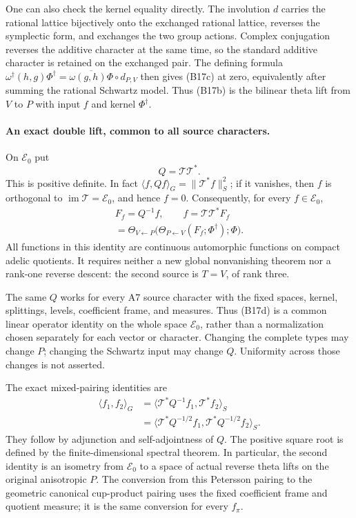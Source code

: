 \documentclass[11pt]{article}
\theoremstyle{definition}\newtheorem{definition}[theorem]{Definition}\newtheorem{remark}[theorem]{Remark}
\begin{document}
One can also check the kernel equality directly. The involution
$d$ carries the rational lattice bijectively onto the exchanged
rational lattice, reverses the symplectic form, and exchanges
the two group actions. Complex conjugation reverses the additive
character at the same time, so the standard additive character
is retained on the exchanged pair. The defining formula
$\omega^\dagger(h,g)\Phi^\dagger
 =\overline{\omega(g,h)\Phi}\circ d_{P,V}$
then gives (B17c) at zero, equivalently after summing the
rational Schwartz model. Thus (B17b) is the bilinear theta lift
from $V$ to $P$ with input $f$ and kernel $\Phi^\dagger$.

\paragraph{An exact double lift, common to all source characters.}
On $\mathcal E_0$ put
\[
 Q=\mathcal T\mathcal T^*.
\]
This is positive definite. In fact
$\langle f,Qf\rangle_G=\|\mathcal T^*f\|_S^2$;
if it vanishes, then $f$ is orthogonal to
$\operatorname{im}\mathcal T=\mathcal E_0$, and hence $f=0$.
Consequently, for every $f\in\mathcal E_0$,
\begin{equation}
\begin{gathered}
 F_f=Q^{-1}f,\qquad
 f=\mathcal T\mathcal T^*F_f\\
   =\Theta_{V\leftarrow P}
          \bigl(\Theta_{P\leftarrow V}(F_f;\Phi^\dagger);
                \Phi\bigr).
\end{gathered}
\tag{B17d}
\end{equation}
All functions in this identity are continuous automorphic
functions on compact adelic quotients. It requires neither a new
global nonvanishing theorem nor a rank-one reverse descent:
the second source is $T=V$, of rank three.

The same $Q$ works for every A7 source character with the fixed
spaces, kernel, splittings, levels, coefficient frame, and
measures. Thus (B17d) is a common linear operator identity on the
whole space $\mathcal E_0$, rather than a normalization chosen
separately for each vector or character. Changing the complete
types may change $P$; changing the Schwartz input may change
$Q$. Uniformity across those changes is not asserted.

The exact mixed-pairing identities are
\begin{equation}
\begin{aligned}
 \langle f_1,f_2\rangle_G
    &=\langle\mathcal T^*Q^{-1}f_1,
                        \mathcal T^*f_2\rangle_S\\
    &=\langle\mathcal T^*Q^{-1/2}f_1,
                        \mathcal T^*Q^{-1/2}f_2\rangle_S .
\end{aligned}
\tag{B17e}
\end{equation}
They follow by adjunction and self-adjointness of $Q$.
The positive square root is defined by the finite-dimensional
spectral theorem. In particular, the second identity is an
isometry from $\mathcal E_0$ to a space of actual reverse theta
lifts on the original anisotropic $P$. The conversion from this
Petersson pairing to the geometric canonical cup-product
pairing uses the fixed coefficient frame and quotient measure;
it is the same conversion for every $f_\pi$.
\end{document}
